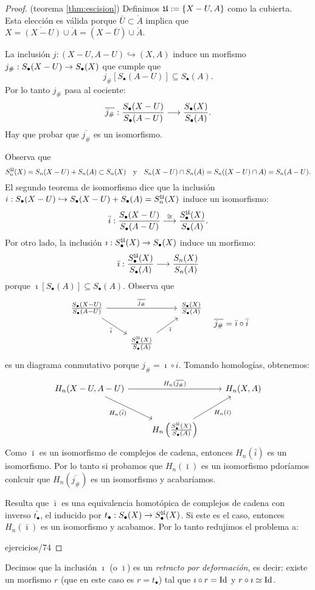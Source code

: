 \documentclass[../../topologia_algebraica]{subfiles}
\begin{document}
\begin{proof}(teorema \ref{thm:escision})
  Definimos $\mathfrak{U}:=\{X-U,A\}$ como la cubierta. Esta elecci\'on es v\'alida porque
  $\bar{U}\subset\mathring{A}$ implica que
  $X=\mathring{(X-U)}\cup \mathring{A}=(X-\bar{U})\cup\mathring{A}$.

  La inclusi\'on $j:(X-U,A-U)\hookrightarrow(X,A)$ induce un morfismo
  $j_{\#}:S_{\bullet}(X-U)\rightarrow S_{\bullet}(X)$ que cumple que
  \[
    j_{\#}[S_{\bullet}(A-U)]\subseteq S_{\bullet}(A).
  \]
  Por lo tanto $j_{\#}$ pasa al cociente:
  \[
    \overline{j_{\#}}:\frac{S_{\bullet}(X-U)}{S_{\bullet}(A-U)}\longrightarrow\frac{S_{\bullet}(X)}{S_{\bullet}(A)}.
  \]
  Hay que probar que $\overline{j_{\#}}$ es un isomorfismo.
  
  Observa que
  \[
    S_n^{\mathfrak{U}}(X)=S_n(X-U)+S_n(A)\subset S_n(X) \quad\text{y}\quad
    S_n(X-U)\cap S_n(A)=S_n((X-U)\cap A)=S_n(A-U).
  \]
  El segundo teorema de isomorfismo dice que la inclusi\'on
  $i:S_{\bullet}(X-U)\hookrightarrow S_{\bullet}(X-U)+S_{\bullet}(A)=S_n^{\mathfrak{U}}(X)$
  induce un isomorfismo:
  \[
    \bar{i}:\frac{S_{\bullet}(X-U)}{S_{\bullet}(A-U)}\stackrel{\cong}{\longrightarrow}
    \frac{S_{\bullet}^{\mathfrak{U}}(X)}{S_{\bullet}(A)}.
  \]
  Por otro lado, la inclusi\'on $\imath:S_{\bullet}^{\mathfrak{U}}(X)\rightarrow S_{\bullet}(X)$
  induce un morfismo:
  \[
    \bar{\imath}:\frac{S_{\bullet}^{\mathfrak{U}}(X)}{S_{\bullet}(A)} \longrightarrow \frac{S_n(X)}{S_n(A)}
  \]
  porque $\imath[S_{\bullet}(A)]\subseteq S_{\bullet}(A)$. Observa que
  \[
    \begin{tikzcd}
      \tfrac{S_{\bullet}(X-U)}{S_{\bullet}(A-U)} \arrow[rr,"\overline{j_{\#}}"]
      \arrow[dr,"\bar{i}"'] && \tfrac{S_{\bullet}(X)}{S_{\bullet}(A)} \\
      & \tfrac{S_{\bullet}^{\fU}(X)}{S_{\bullet}(A)} \arrow[ur,"\bar{\imath}"'] &
    \end{tikzcd}\quad \overline{j_{\#}}=\bar{\imath}\circ\bar{i}
  \]
  es un diagrama conmutativo porque $j_{\#}=\imath\circ i$. Tomando homolog\'ias, obtenemos:
  \[
    \begin{tikzcd}[row sep=large]
      H_n(X-U,A-U) \arrow[rr,"H_n(\overline{j_{\#}})"] \arrow[dr,"H_n(\bar{i})"'] && H_n(X,A) \\
      & H_n\paren{\tfrac{S_{\bullet}^{\fU}(X)}{S_{\bullet}(A)}} \arrow[ur,"H_n(\bar{\imath})"'] &
    \end{tikzcd}
  \]
  Como $\bar{\imath}$ es un isomorfismo de complejos de cadena, entonces $H_n(\bar{i})$
  es un isomorfismo. Por lo tanto si probamos que $H_n(\bar{\imath})$ es un isomorfismo
  pdor\'iamos conlcuir que $H_n(\overline{j_{\#}})$ es un isomorfismo y acabar\'iamos.
  
  Resulta que $\bar{\imath}$ es una equivalencia homot\'opica de complejos de cadena con
  inverso $\bar{t_{\bullet}}$, el inducido por $t_{\bullet}:S_{\bullet}(X)\rightarrow S_{\bullet}^{\mathfrak{U}}(X)$.
  Si este es el caso, entonces $H_n(\bar{\imath})$ es un isomorfismo y acabamos. Por lo tanto
  redujimos el problema a:
  
{ejercicios/74} %
\end{proof}

Decimos que la inclusi\'on $\imath$ (o $\bar{\imath}$) es un \emph{retracto por deformaci\'on},
es decir: existe un morfismo $r$ (que en este caso es $r=t_{\bullet}$) tal que $\imath\circ r=\text{Id}$
y $r\circ\imath\simeq\text{Id}$.
\end{document}
